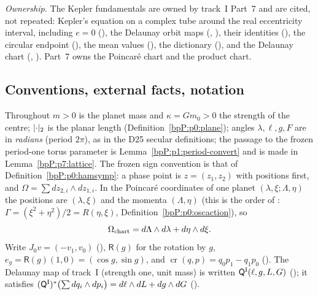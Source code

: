 \emph{Ownership.} The Kepler fundamentals are owned by track~I Part~7 and are cited, not repeated: Kepler's equation on a complex tube around the real eccentricity interval, including $e=0$ (),
the Delaunay orbit maps (, ), their identities (), the circular endpoint (), the mean values (), the dictionary
(), and the Delaunay chart (, ). Part~7 owns the Poincar\'e chart and the product chart.

\subsection{Conventions, external facts, notation}\label{bpP:p7:conv}

Throughout $m>0$ is the planet mass and $\kappa=Gm_0>0$ the strength of the centre; $\lvert \cdot\rvert_2$ is the planar length (Definition~\ref{bpP:p0:plane}); angles $\lambda,\ell,g,F$ are in \emph{radians} (period $2\pi$), as in the D25 secular
definitions; the passage to the frozen period-one torus parameter is Lemma~\ref{bpP:p1:period-convert} and is made in Lemma~\ref{bpP:p7:lattice}. The frozen sign convention is that of Definition~\ref{bpP:p0:hamsymp}: a phase point is
$z=(z_1,z_2)$ with positions first, and $\Omega=\sum dz_{2,i}\wedge dz_{1,i}$. In the Poincar\'e coordinates of one planet $(\lambda,\xi;\Lambda,\eta)$ the positions are $(\lambda,\xi)$ and the momenta $(\Lambda,\eta)$
(this is the order of : $\Gamma=(\xi^2+\eta^2)/2=R(\eta,\xi)$, Definition~\ref{bpP:p0:oscaction}), so
\[\Omega_{\rm chart}=d\Lambda\wedge d\lambda+d\eta\wedge d\xi .\]
Write $J_0v=(-v_1,v_0)$ (), $\mathsf R(g)$ for the rotation by $g$, $e_g=\mathsf R(g)(1,0)=(\cos g,\sin g)$, and $\operatorname{cr}(q,p)=q_0p_1-q_1p_0$ ().
The Delaunay map of track~I (strength one, unit mass) is written $\mathsf Q^{\rm I}(\ell,g,L,G)$ (); it satisfies $(\mathsf Q^{\rm I})^*\bigl(\sum dq_i\wedge dp_i\bigr)=d\ell\wedge dL+dg\wedge dG$ ().

